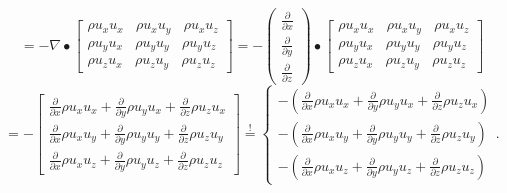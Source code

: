 \documentclass[MathematicsNumericsDerivationsAndOpenFOAM.tex]{subfiles}
\begin{document}
%
%
%
\begin{equation*}
= -   \nabla \bullet
  \left[
  \begin{matrix}
    \rho u_x u_x ~~~~ \rho u_x u_y ~~~~ \rho u_x u_z \\
    \rho u_y u_x ~~~~ \rho u_y u_y ~~~~ \rho u_y u_z \\
    \rho u_z u_x ~~~~ \rho u_z u_y ~~~~ \rho u_z u_z
  \end{matrix}
  \right]
=
- \left(
  \begin{matrix}
    \frac{\partial}{\partial x} \\
    \frac{\partial}{\partial y} \\
    \frac{\partial}{\partial z}
  \end{matrix}
  \right)
  \bullet
  \left[
  \begin{matrix}
    \rho u_x u_x ~~~~ \rho u_x u_y ~~~~ \rho u_x u_z \\
    \rho u_y u_x ~~~~ \rho u_y u_y ~~~~ \rho u_y u_z \\
    \rho u_z u_x ~~~~ \rho u_z u_y ~~~~ \rho u_z u_z
  \end{matrix}
  \right]
\end{equation*}
%
%
\begin{equation*}
= - \left[
  \begin{matrix}
    \frac{\partial}{\partial x} \rho u_x u_x +
    \frac{\partial}{\partial y} \rho u_y u_x +
    \frac{\partial}{\partial z} \rho u_z u_x \\
    \frac{\partial}{\partial x} \rho u_x u_y +
    \frac{\partial}{\partial y} \rho u_y u_y +
    \frac{\partial}{\partial z} \rho u_z u_y \\
    \frac{\partial}{\partial x} \rho u_x u_z +
    \frac{\partial}{\partial y} \rho u_y u_z +
    \frac{\partial}{\partial z} \rho u_z u_z
  \end{matrix}
  \right]
\overset{!}{=}
\begin{cases}
  -\left(
      \frac{\partial}{\partial x} \rho u_x u_x
      +\frac{\partial}{\partial y} \rho u_y u_x
      +\frac{\partial}{\partial z} \rho u_z u_x
  \right)%
  \\
  -\left(
      \frac{\partial}{\partial x} \rho u_x u_y
      +\frac{\partial}{\partial y} \rho u_y u_y
      +\frac{\partial}{\partial z} \rho u_z u_y
  \right)%
  \\
  -\left(
      \frac{\partial}{\partial x} \rho u_x u_z
      +\frac{\partial}{\partial y} \rho u_y u_z
      +\frac{\partial}{\partial z} \rho u_z u_z
  \right)%
\end{cases}
  .
\end{equation*}
\end{document}
